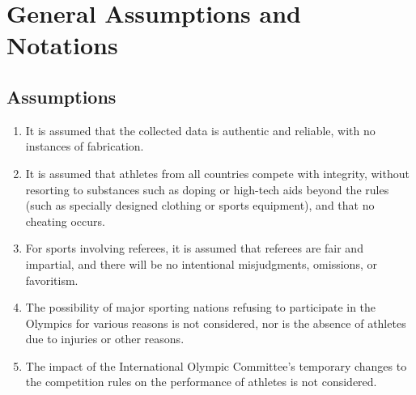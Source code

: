 \documentclass[12pt]{article}
\begin{document}
\section{General Assumptions and Notations}

\subsection{Assumptions}

\begin{enumerate}[itemsep=0pt, topsep=0pt]
    \item It is assumed that the collected data is authentic and reliable, with no instances of fabrication.
    \item It is assumed that athletes from all countries compete with integrity, without resorting to substances such as doping or high-tech aids beyond the rules (such as specially designed clothing or sports equipment), and that no cheating occurs.
    \item For sports involving referees, it is assumed that referees are fair and impartial, and there will be no intentional misjudgments, omissions, or favoritism.
    \item The possibility of major sporting nations refusing to participate in the Olympics for various reasons is not considered, nor is the absence of athletes due to injuries or other reasons.
    \item The impact of the International Olympic Committee's temporary changes to the competition rules on the performance of athletes is not considered.
\end{enumerate}
\end{document}
